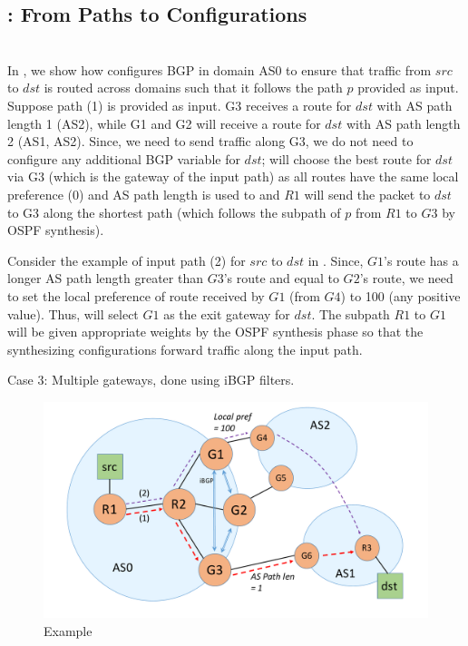 \subsection{\name: From Paths to Configurations}
 \\


In , we show how \name configures BGP in domain AS0 
to ensure that traffic from $src$ to $dst$ is routed across domains 
such that it follows the path $p$ provided as input. Suppose path (1) is
provided as input. G3 receives a route for $dst$ with AS path length 1
(AS2), while G1 and G2 will receive a route for $dst$ with 
AS path length 2 (AS1, AS2). Since, we need to send traffic along
G3, we do not need to configure any additional BGP variable for $dst$;
 will choose the best route for $dst$ 
via G3 (which is the gateway of the input path) as all routes have
the same local preference (0) and AS path length is used to  and $R1$ will
send the packet to $dst$ to G3 along the shortest path (which 
follows the subpath of $p$ from $R1$ to $G3$ by OSPF synthesis). 

Consider the example of input path (2) for $src$ to $dst$ 
in . Since, $G1$'s route has a longer AS 
path length greater than $G3$'s route and equal to $G2$'s route,
we need to set the local preference of route received by $G1$ 
(from $G4$) to 100 (any positive value). Thus,  
will select $G1$ as the exit gateway for $dst$. The subpath
$R1$ to $G1$ will be given appropriate weights by the OSPF
synthesis phase so that the synthesizing configurations 
forward traffic along the input path. 

Case 3: Multiple gateways, done using iBGP filters. 
\begin{figure}[!t] 
	\centering
	\includegraphics[width=\columnwidth]{figures/bgp-example.pdf}
	\caption{Example} \label{fig:bgpeg}
\end{figure}


